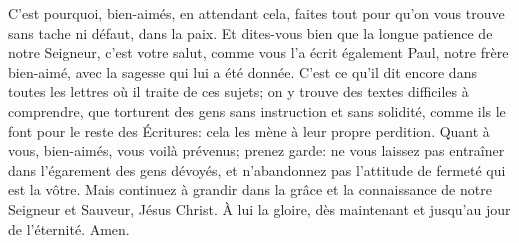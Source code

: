 C’est pourquoi, bien-aimés, en attendant cela,
	faites tout pour qu’on vous trouve sans tache ni défaut, dans la paix.
Et dites-vous bien que la longue patience de notre Seigneur, c’est votre salut,
	comme vous l’a écrit également Paul, notre frère bien-aimé,
	avec la sagesse qui lui a été donnée.
C’est ce qu’il dit encore dans toutes les lettres où il traite de ces sujets;
	on y trouve des textes difficiles à comprendre,
	que torturent des gens sans instruction et sans solidité,
	comme ils le font pour le reste des Écritures:
	cela les mène à leur propre perdition.
Quant à vous, bien-aimés, vous voilà prévenus; prenez garde:
	ne vous laissez pas entraîner dans l’égarement des gens dévoyés,
	et n’abandonnez pas l’attitude de fermeté qui est la vôtre.
Mais continuez à grandir
	dans la grâce et la connaissance de notre Seigneur et Sauveur, Jésus Christ.
À lui la gloire, dès maintenant et jusqu’au jour de l’éternité. Amen.
